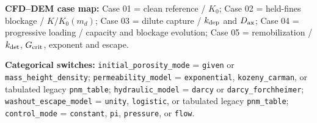 \documentclass[a4paper,9pt]{article}
\begin{document}
\begin{landscape}
\vspace{2mm}
{\footnotesize
\textbf{CFD--DEM case map:}
Case 01 = clean reference / $K_0$; Case 02 = held-fines blockage / $K/K_0(m_d)$; Case 03 = dilute capture / $k_{\rm dep}$ and $D_{\rm ax}$; Case 04 = progressive loading / capacity and blockage evolution; Case 05 = remobilization / $k_{\rm det}$, $G_{\rm crit}$, exponent and escape.

\textbf{Categorical switches:}
\texttt{initial\_porosity\_mode} = \texttt{given} or \texttt{mass\_height\_density};
\texttt{permeability\_model} = \texttt{exponential}, \texttt{kozeny\_carman}, or tabulated legacy \texttt{pnm\_table};
\texttt{hydraulic\_model} = \texttt{darcy} or \texttt{darcy\_forchheimer};
\texttt{washout\_escape\_model} = \texttt{unity}, \texttt{logistic}, or tabulated legacy \texttt{pnm\_table};
\texttt{control\_mode} = \texttt{constant}, \texttt{pi}, \texttt{pressure}, or \texttt{flow}.
}

\end{landscape}
\end{document}

